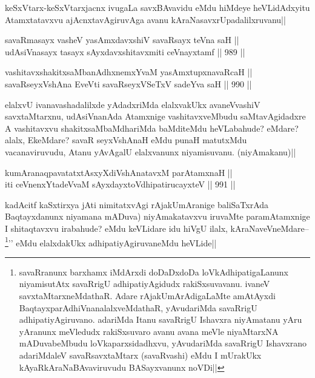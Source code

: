 \begin{artha}
keSxVtarx-keSxVtarxjacnx ivugaLa savxBAvavidu eMdu hiMdeye heVLidAdxyitu Atamxtatavxvu ajAcnxtavAgiruvAga avanu kAraNasavxrUpadalilxruvanu||
\end{artha}


\begin{shl}
savaRmasayx vasheV yasAmxdavxshiV savaRsayx teVna saH || \\
udAsiVnasayx tasayx sAyxdavxshitavxmiti ceVnayxtamf ||  989 ||  
\end{shl}

\begin{shl}
vashitavxshakitxsaMbanAdhxnemxYvaM yasAmxtupxnavaRcaH || \\
savaRseyxVshAna EveVti savaRseyxVSeTxV sadeYva saH ||  990 ||  
\end{shl}

\begin{artha}
elalxvU ivanavashadalilxde yAdadxriMda elalxvakUkx avaneVvashiV savxtaMtarxnu, udAsiVnanAda Atamxnige vashitavxveMbudu saMtavAgidadxre A vashitavxvu shakitxsaMbaMdhariMda baMditeMdu heVLabahude? eMdare? alalx, EkeMdare? savaR seyxVshAnaH eMdu punaH matutxMdu vacanaviruvudu, Atanu yAvAgalU elalxvanunx niyamisuvanu. (niyAmakanu)||
\end{artha}


\begin{shl}
kumAranaqpavatatxtAsxyXdiVshAnatavxM parAtamxnaH ||  \\
iti ceVnenxYtadeVvaM sAyxdayxtoV\s dhipatirucayxteV ||  991 ||  
\end{shl}

\begin{artha}
kadAcitf kaSxtirxya jAti nimitatxvAgi rAjakUmAranige baliSaTxrAda Baqtayxdanunx niyamana mADuva) niyAmakatavxvu iruvaMte paramAtamxnige I shitaqtavxvu irabahude? eMdu keVLidare idu hiVgU ilalx, kAraNaveVneMdare--\footnote{savaRranunx barxhamx iMdArxdi doDaDxdoDa loVkAdhipatigaLanunx niyamisutAtx savaRrigU adhipatiyAgidudx rakiSxsuvavanu. ivaneV savxtaMtarxneMdathaR. Adare rAjakUmArAdigaLaMte amAtAyxdi BaqtayxparAdhiVnanalalxveMdathaR, yAvudariMda savaRrigU adhipatiyAgiruvano. adariMda Itanu savaRrigU Ishavxra niyAmatanu yAru yAranunx meVledudx rakiSxsuvaro avanu avana meVle niyaMtarxNA mADuvabeMbudu loVkaparxsidadhxvu, yAvudariMda savaRrigU Ishavxrano adariMdaleV savaRsavxtaMtarx (savaRvashi) eMdu I mUrakUkx kAyaRkAraNaBAvaviruvudu BASayxvanunx noVDi||}'\stext' eMdu elalxdakUkx adhipatiyAgiruvaneMdu heVLide||
\end{artha}

